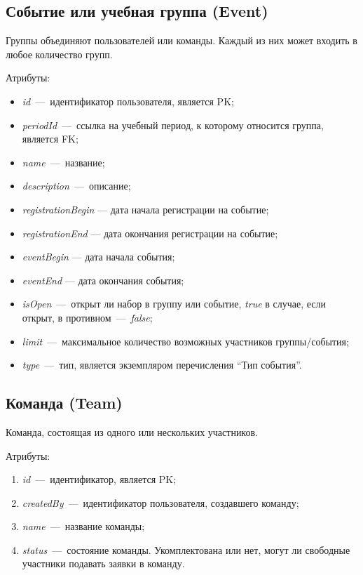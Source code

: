 \documentclass[14pt]{article}
\begin{document}
\subsection{Событие или учебная группа (Event)}

Группы объединяют пользователей или команды. Каждый из них может входить в любое количество групп.

Атрибуты:
\begin{itemize}
	\item \emph{id}~---~идентификатор пользователя, является PK;
	\item \emph{periodId}~---~ссылка на учебный период, к которому относится группа, является FK;
	\item \emph{name}~---~название;
	\item \emph{description}~---~описание;
	\item \emph{registrationBegin} --- дата начала регистрации на событие;
	\item \emph{registrationEnd} --- дата окончания регистрации на событие;
	\item \emph{eventBegin} --- дата начала события;
	\item \emph{eventEnd} --- дата окончания события;
	\item \emph{isOpen}~---~открыт ли набор в группу или событие, \emph{true} в случае, если открыт, в противном~---~\emph{false};
	\item \emph{limit}~---~максимальное количество возможных участников группы/события;	
	\item \emph{type}~---~тип, является экземпляром перечисления ``Тип события''.
\end{itemize}

\subsection{Команда (Team)}

Команда, состоящая из одного или нескольких участников.

Атрибуты:
\begin{enumerate}
	\item \emph{id}~---~идентификатор, является PK; 
	\item \emph{createdBy}~---~идентификатор пользователя, создавшего команду; 
	\item \emph{name}~---~название команды; 
	\item \emph{status}~---~состояние команды. Укомплектована или нет, могут ли свободные участники подавать заявки в команду.
\end{enumerate}
\end{document}
